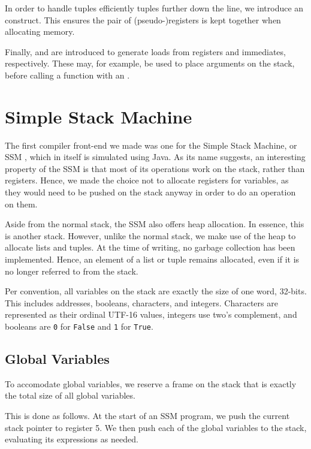 In order to handle tuples efficiently tuples further down the line, we introduce an  construct.
This ensures the pair of (pseudo-)registers is kept together when allocating memory.

Finally,  and  are introduced to generate loads from registers and immediates, respectively.
These may, for example, be used to place arguments on the stack, before calling a function with an .


\section{Simple Stack Machine}

The first compiler front-end we made was one for the Simple Stack Machine, or SSM \cite{SSM}, which in itself is simulated using Java.
As its name suggests, an interesting property of the SSM is that most of its operations work on the stack, rather than registers.
Hence, we made the choice not to allocate registers for variables, as they would need to be pushed on the stack anyway in order to do an operation on them.

Aside from the normal stack, the SSM also offers heap allocation.
In essence, this is another stack.
However, unlike the normal stack, we make use of the heap to allocate lists and tuples.
At the time of writing, no garbage collection has been implemented.
Hence, an element of a list or tuple remains allocated, even if it is no longer referred to from the stack.

Per convention, all variables on the stack are exactly the size of one word, 32-bits.
This includes addresses, booleans, characters, and integers.
Characters are represented as their ordinal UTF-16 values, integers use two's complement, and booleans are \texttt{0} for \texttt{False} and \texttt{1} for \texttt{True}.


\subsection{Global Variables}

To accomodate global variables, we reserve a frame on the stack that is exactly the total size of all global variables.

This is done as follows.
At the start of an SSM program, we push the current stack pointer to register 5.
We then push each of the global variables to the stack, evaluating its expressions as needed.

